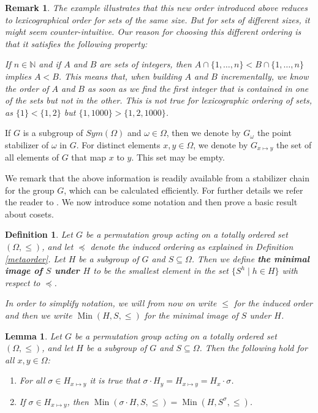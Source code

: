 \documentclass[preprint,12pt]{elsarticle}
\newtheorem{lem}[theorem]{Lemma}
\newtheorem{rem}[theorem]{Remark}
\newtheorem{defi}[theorem]{Definition}
\newcommand{\Sym}[1]{\ensuremath{Sym(#1)}}
\newcommand{\N}{\mathbb{N}}
\newcommand{\Min}{\operatorname{Min}}
\begin{document}
\begin{rem}
The example illustrates that this new order introduced above reduces to lexicographical order for sets of the same size. But for sets of different sizes, it might seem counter-intuitive. Our reason for choosing this different ordering is that it satisfies the
following property:

If \(n \in \N\) and if \(A\) and \(B\) are sets of integers, then \(A \cap \{1,\dots,n\} < B \cap \{1,\dots,n\}\) implies \(A < B\). This means that, when building \(A\) and \(B\) incrementally, we know the order of \(A\) and \(B\) as soon as we find the first integer that is contained in one of the sets but not in the other. This is not true for lexicographic ordering of sets, as \(\{1\} < \{1,2\}\) but \(\{1,1000\} > \{1,2,1000\}\).
\end{rem}

If $G$ is a subgroup of $\Sym{\Omega}$ and $\omega \in \Omega$, then we denote by
$G_\omega$ the point stabilizer of $\omega$ in $G$. For distinct elements
$x,y \in \Omega$, we denote by \(G_{x \mapsto y}\)  the set of all elements of
$G$ that map $x$ to $y$. This set may be empty.

We remark that the above information is readily available from a stabilizer chain
for the group $G$, which can be calculated efficiently. For further details
we refer the reader to \cite{HCG}. We now introduce some notation and then prove a basic result about cosets.

\begin{defi}
 Let $G$ be a permutation group acting on a totally ordered set
 $(\Omega, \leq)$, and let $\preccurlyeq$ denote the induced ordering as explained in Definition \ref{metaorder}.
Let $H$ be a subgroup of $G$ and $S \subseteq \Omega$.
Then we define
  \textbf{the minimal image of $S$ under $H$} to be the smallest element in the set
  $\{S^h \mid h \in H\}$ with respect to $\preccurlyeq$.

In order to simplify notation, we will from now on write $\leq$ for the induced order and then we write $\Min(H,S,\leq)$ for the minimal image of $S$ under $H$.
\end{defi}


\begin{lem}\label{miniprop}
  Let $G$ be a permutation group acting on a totally ordered set
  $(\Omega, \leq)$, and let $H$ be a subgroup of $G$ and $S \subseteq \Omega$.
  Then the following hold for all $x,y \in \Omega$:

\begin{enumerate}

\item
  For all $\sigma \in H_{x \mapsto y}$ it is true that
  $\sigma \cdot H_y=H_{x\mapsto y}=H_x \cdot \sigma$.

\item
  If $\sigma \in H_{x \mapsto y}$, then
  \(\Min(\sigma \cdot H, S, \leq) = \Min(H, S^{\sigma}, \leq)\).
\end{enumerate}
\end{lem}
\end{document}
